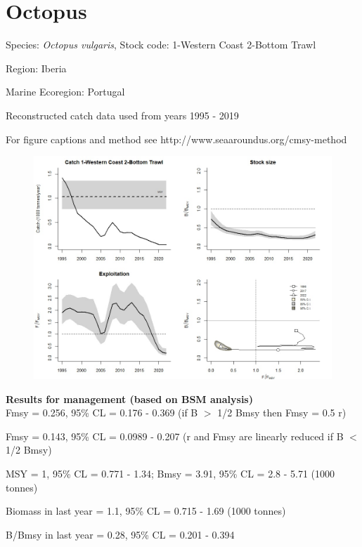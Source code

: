 \documentclass[12pt,a4paper]{article}\usepackage[]{graphicx}\usepackage[]{xcolor}
\begin{document}
    \section*{Octopus}


    Species: \emph{Octopus vulgaris}, Stock code: 1-Western Coast 2-Bottom Trawl

Region: Iberia

Marine Ecoregion: Portugal

Reconstructed catch data used from years 1995 - 2019 

 For figure captions and method see http://www.seaaroundus.org/cmsy-method

    \begin{figure}[ht]
    \centering
    \includegraphics[width=1.00\textwidth ext=.jpg type=jpg]{1-Western Coast 2-Bottom Trawl_MAN.jpg}
    \end{figure}

    \textbf{Results for management (based on BSM analysis)}\\

Fmsy = 0.256, 95\% CL = 0.176 - 0.369 (if B $>$ 1/2 Bmsy then Fmsy = 0.5 r)

Fmsy = 0.143, 95\% CL = 0.0989 - 0.207 (r and Fmsy are linearly reduced if B $<$ 1/2 Bmsy)

MSY = 1,  95\% CL = 0.771 - 1.34; Bmsy = 3.91,  95\% CL = 2.8 - 5.71 (1000 tonnes)

Biomass in last year = 1.1, 95\% CL = 0.715 - 1.69 (1000 tonnes)

B/Bmsy in last year = 0.28, 95\% CL = 0.201 - 0.394
\end{document}
